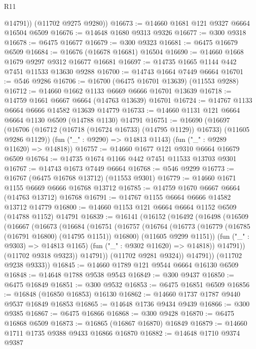 \begin{lexlean}{R11}
\begin{coremodule}
          @14791))
      (@11702 @9275 @9280))
@16673 := @14660 @1681 @121 @9327 @6664 @16504 @6509
@16676 := @14648 @1680 @9313 @9326
@16677 := @300 @9318
@16678 := @6475 @16677
@16679 := @300 @9323
@16681 := @6475 @16679 @6509
@16684 := @16676 (@16678 @16681) @16504
@16690 := @14660 @1668 @1679 @9297 @9312 @16677 @16681
@16697 := @14735 @1665 @1144 @442 @7451 @11533 @13630 @9288
@16700 := @14743 @1664 @7449 @6664
@16701 := @546 @9286
@16706 := @16700 (@6475 @16701 @13639) (@11553 @9288)
@16712 := @14660 @1662 @1133 @6669 @6666 @16701 @13639
@16718 := @14759 @1661 @6667 @6664 (@14763 @13639) @16701
@16724 := @14767 @1133 @6664 @6666 @14582 @13639 @14779
@16733 := @14660 @1131 @121 @6664 @6664 @1130 @6509 (@14788 @1130) @14791
@16751 := @16690
    (@16697
      (@16706 (@16712 (@16718 (@16724 @16733) (@14795 @1129)) @16733) (@11605 @9286 @1129))
      (fun ("_" : @9290) => @14813 @1143)
      (fun ("_" : @9289 @11620) => @14818))
@16757 := @14660 @1677 @121 @9310 @6664 @16679 @6509
@16764 := @14735 @1674 @1166 @442 @7451 @11533 @13703 @9301
@16767 := @14743 @1673 @7449 @6664
@16768 := @546 @9299
@16773 := @16767 (@6475 @16768 @13712) (@11553 @9301)
@16779 := @14660 @1671 @1155 @6669 @6666 @16768 @13712
@16785 := @14759 @1670 @6667 @6664 (@14763 @13712) @16768
@16791 := @14767 @1155 @6664 @6666 @14582 @13712 @14779
@16800 := @14660 @1153 @121 @6664 @6664 @1152 @6509 (@14788 @1152) @14791
@16839 := @16141
    (@16152
      (@16492
        (@16498
          (@16509
            (@16667
              (@16673
                (@16684
                  (@16751
                    (@16757
                      (@16764
                        (@16773
                          (@16779 (@16785 (@16791 @16800) (@14795 @1151)) @16800)
                          (@11605 @9299 @1151))
                        (fun ("_" : @9303) => @14813 @1165)
                        (fun ("_" : @9302 @11620) => @14818))
                      @14791))
                  (@11702 @9318 @9323))
                @14791))
            (@11702 @9281 @9324))
          @14791))
      (@11702 @9238 @9333))
@16845 := @14660 @1789 @121 @9544 @6664 @16130 @6509
@16848 := @14648 @1788 @9538 @9543
@16849 := @300 @9437
@16850 := @6475 @16849
@16851 := @300 @9532
@16853 := @6475 @16851 @6509
@16856 := @16848 (@16850 @16853) @16130
@16862 := @14660 @1737 @1787 @9440 @9537 @16849 @16853
@16865 := @14648 @1736 @9434 @9439
@16866 := @300 @9385
@16867 := @6475 @16866
@16868 := @300 @9428
@16870 := @6475 @16868 @6509
@16873 := @16865 (@16867 @16870) @16849
@16879 := @14660 @1711 @1735 @9388 @9433 @16866 @16870
@16882 := @14648 @1710 @9374 @9387

\end{coremodule}
\end{lexlean}
